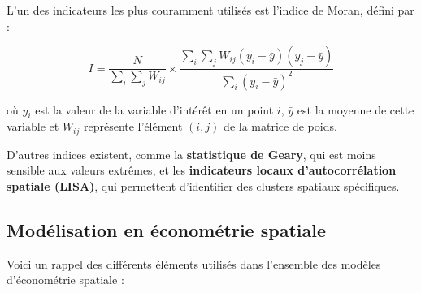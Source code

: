 \documentclass[
]{article}
\begin{document}
L'un des indicateurs les plus couramment utilisés est l'indice de Moran,
défini par :

\[
I = \frac{N}{\sum_{i} \sum_{j} W_{ij}} \times \frac{\sum_{i} \sum_{j} W_{ij} (y_i - \bar{y})(y_j - \bar{y})}{\sum_{i} (y_i - \bar{y})^2}
\]

où \(y_i\) est la valeur de la variable d'intérêt en un point \(i\),
\(\bar{y}\) est la moyenne de cette variable et \(W_{ij}\) représente
l'élément \((i, j)\) de la matrice de poids.

D'autres indices existent, comme la \textbf{statistique de Geary}, qui
est moins sensible aux valeurs extrêmes, et les
\textbf{indicateurs locaux d'autocorrélation spatiale (LISA)}, qui
permettent d'identifier des clusters spatiaux spécifiques.

\subsection{Modélisation en économétrie
spatiale}\label{moduxe9lisation-en-uxe9conomuxe9trie-spatiale}

Voici un rappel des différents éléments utilisés dans l'ensemble des
modèles d'économétrie spatiale :
\end{document}
